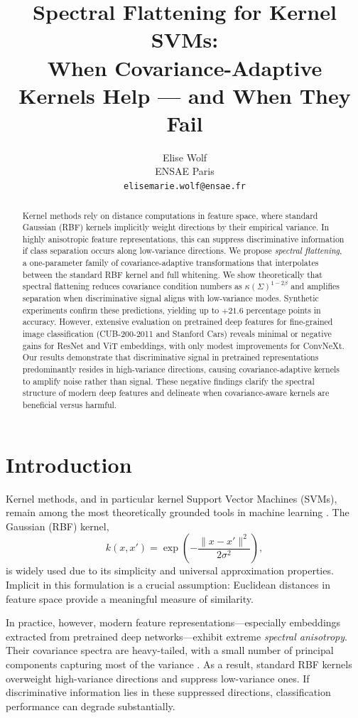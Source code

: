 \documentclass{article}
\title{Spectral Flattening for Kernel SVMs:\\
When Covariance-Adaptive Kernels Help --- and When They Fail}
\author{
Elise Wolf \\
ENSAE Paris \\
\texttt{elisemarie.wolf@ensae.fr}
}
\begin{document}
\maketitle

\begin{abstract}
Kernel methods rely on distance computations in feature space, where standard Gaussian (RBF) kernels implicitly weight directions by their empirical variance. In highly anisotropic feature representations, this can suppress discriminative information if class separation occurs along low-variance directions. We propose \emph{spectral flattening}, a one-parameter family of covariance-adaptive transformations that interpolates between the standard RBF kernel and full whitening. We show theoretically that spectral flattening reduces covariance condition numbers as $\kappa(\Sigma)^{1-2\beta}$ and amplifies separation when discriminative signal aligns with low-variance modes. Synthetic experiments confirm these predictions, yielding up to $+21.6$ percentage points in accuracy. However, extensive evaluation on pretrained deep features for fine-grained image classification (CUB-200-2011 and Stanford Cars) reveals minimal or negative gains for ResNet and ViT embeddings, with only modest improvements for ConvNeXt. Our results demonstrate that discriminative signal in pretrained representations predominantly resides in high-variance directions, causing covariance-adaptive kernels to amplify noise rather than signal. These negative findings clarify the spectral structure of modern deep features and delineate when covariance-aware kernels are beneficial versus harmful.
\end{abstract}

\section{Introduction}

Kernel methods, and in particular kernel Support Vector Machines (SVMs), remain among the most theoretically grounded tools in machine learning \cite{scholkopf2002learning}. The Gaussian (RBF) kernel,
\[
k(x,x') = \exp\left(-\frac{\|x-x'\|^2}{2\sigma^2}\right),
\]
is widely used due to its simplicity and universal approximation properties. Implicit in this formulation is a crucial assumption: Euclidean distances in feature space provide a meaningful measure of similarity.

In practice, however, modern feature representations—especially embeddings extracted from pretrained deep networks—exhibit extreme \emph{spectral anisotropy}. Their covariance spectra are heavy-tailed, with a small number of principal components capturing most of the variance \cite{papyan2020prevalence}. As a result, standard RBF kernels overweight high-variance directions and suppress low-variance ones. If discriminative information lies in these suppressed directions, classification performance can degrade substantially.
\end{document}

